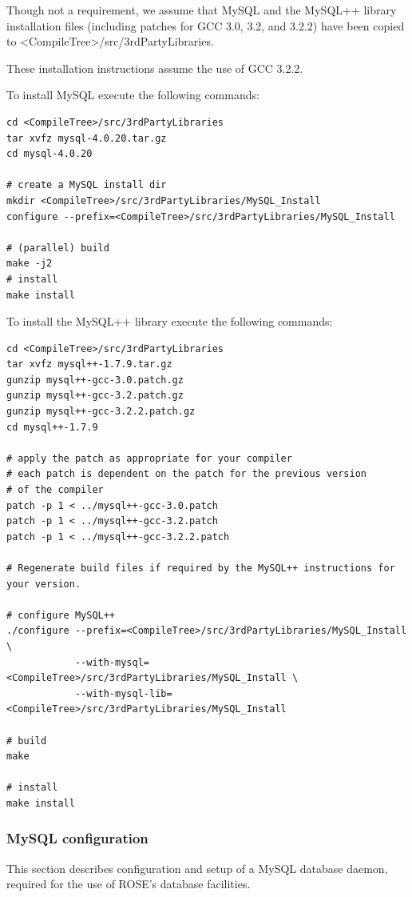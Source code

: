 \documentclass[times, 10pt]{book}
\begin{document}
Though not a requirement, we assume that MySQL and the MySQL++ library
installation files (including patches for GCC 3.0, 3.2, and 3.2.2) have been
copied to \textless{}CompileTree\textgreater{}/src/3rdPartyLibraries.  

These installation instructions assume the use of GCC 3.2.2.

To install MySQL execute the following commands:

\begin{verbatim}
cd <CompileTree>/src/3rdPartyLibraries
tar xvfz mysql-4.0.20.tar.gz
cd mysql-4.0.20

# create a MySQL install dir
mkdir <CompileTree>/src/3rdPartyLibraries/MySQL_Install
configure --prefix=<CompileTree>/src/3rdPartyLibraries/MySQL_Install

# (parallel) build
make -j2
# install
make install
\end{verbatim}

To install the MySQL++ library execute the following commands:

\begin{verbatim}
cd <CompileTree>/src/3rdPartyLibraries
tar xvfz mysql++-1.7.9.tar.gz
gunzip mysql++-gcc-3.0.patch.gz
gunzip mysql++-gcc-3.2.patch.gz
gunzip mysql++-gcc-3.2.2.patch.gz
cd mysql++-1.7.9

# apply the patch as appropriate for your compiler
# each patch is dependent on the patch for the previous version 
# of the compiler
patch -p 1 < ../mysql++-gcc-3.0.patch
patch -p 1 < ../mysql++-gcc-3.2.patch
patch -p 1 < ../mysql++-gcc-3.2.2.patch

# Regenerate build files if required by the MySQL++ instructions for your version.

# configure MySQL++
./configure --prefix=<CompileTree>/src/3rdPartyLibraries/MySQL_Install \
            --with-mysql=<CompileTree>/src/3rdPartyLibraries/MySQL_Install \
            --with-mysql-lib=<CompileTree>/src/3rdPartyLibraries/MySQL_Install

# build
make

# install
make install
\end{verbatim}

\subsubsection{MySQL configuration}

This section describes configuration and setup of a MySQL database daemon,
required for the use of ROSE's database facilities.
\end{document}
